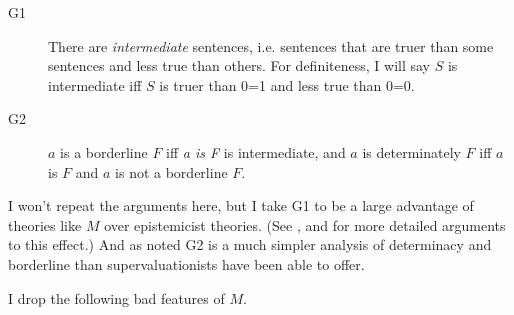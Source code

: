 \begin{description}
\item[G1]
There are \emph{intermediate} sentences, i.e. sentences that are truer
than some sentences and less true than others. For definiteness, I will
say \(S\) is intermediate iff \(S\) is truer than 0=1 and less true than
0=0.
\item[G2]
\(a\) is a borderline \(F\) iff \emph{a is F} is intermediate, and \(a\)
is determinately \(F\) iff \(a\) is \(F\) and \(a\) is not a borderline
\(F\).
\end{description}

I won't repeat the arguments here, but I take G1 to be a large advantage
of theories like \(M\) over epistemicist theories. (See
\citet{Burgess2001}, \citet{Sider2001} and \citet{Weatherson2003-WEAEPA}
for more detailed arguments to this effect.) And as noted G2 is a much
simpler analysis of determinacy and borderline than supervaluationists
have been able to offer.

I drop the following bad features of \(M\).

